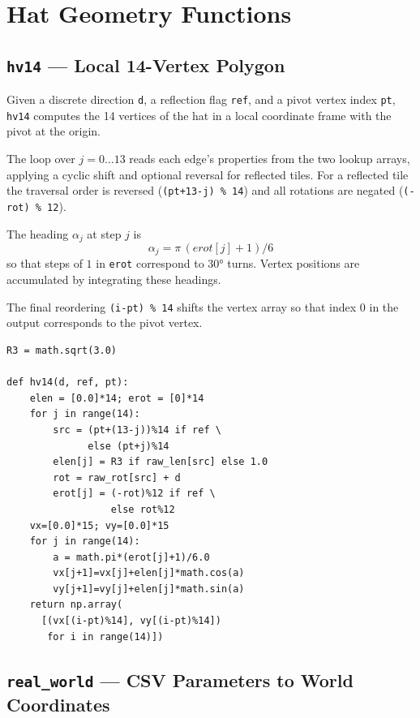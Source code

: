 \documentclass[10pt,a4paper]{article}
\let\polysection\section
\renewcommand\section{\needspace{0.16\textheight}\polysection}
\let\polysubsection\subsection
\renewcommand\subsection{\needspace{0.12\textheight}\polysubsection}
\newcommand{\code}[1]{\texttt{\small #1}}
\begin{document}
\section{Hat Geometry Functions}

\subsection{\code{hv14} — Local 14-Vertex Polygon}

\begin{tcolorbox}[dualbox, title={\code{hv14(d, ref, pt)} — build the 14 vertices}]
  Given a discrete direction \code{d}, a reflection flag \code{ref},
  and a pivot vertex index \code{pt}, \code{hv14} computes the 14 vertices of
  the hat in a local coordinate frame with the pivot at the origin.

  The loop over $j = 0\ldots 13$ reads each edge's properties from the two
  lookup arrays, applying a cyclic shift and optional reversal for reflected
  tiles.  For a reflected tile the traversal order is reversed
  (\code{(pt+13-j) \% 14}) and all rotations are negated
  (\code{(-rot) \% 12}).

  The heading $\alpha_j$ at step $j$ is
  \[
    \alpha_j = \pi\,(\mathit{erot}[j] + 1)/6
  \]
  so that steps of $1$ in \code{erot} correspond to $30°$ turns.
  Vertex positions are accumulated by integrating these headings.

  The final reordering \code{(i-pt) \% 14} shifts the vertex array so
  that index $0$ in the output corresponds to the pivot vertex.
\tcblower
\begin{verbatim}
R3 = math.sqrt(3.0)

def hv14(d, ref, pt):
    elen = [0.0]*14; erot = [0]*14
    for j in range(14):
        src = (pt+(13-j))%14 if ref \
              else (pt+j)%14
        elen[j] = R3 if raw_len[src] else 1.0
        rot = raw_rot[src] + d
        erot[j] = (-rot)%12 if ref \
                  else rot%12
    vx=[0.0]*15; vy=[0.0]*15
    for j in range(14):
        a = math.pi*(erot[j]+1)/6.0
        vx[j+1]=vx[j]+elen[j]*math.cos(a)
        vy[j+1]=vy[j]+elen[j]*math.sin(a)
    return np.array(
      [(vx[(i-pt)%14], vy[(i-pt)%14])
       for i in range(14)])
\end{verbatim}
\end{tcolorbox}

\subsection{\code{real\_world} — CSV Parameters to World Coordinates}
\end{document}
